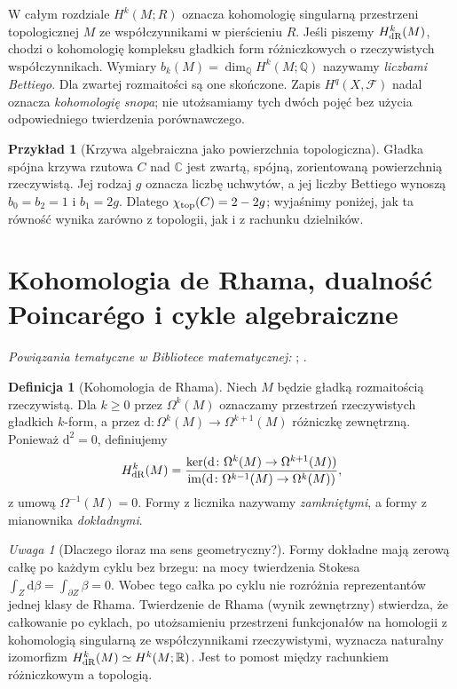 \documentclass[11pt,a4paper,openany]{report}
\numberwithin{equation}{section}
\theoremstyle{plain}
\theoremstyle{definition}
\newtheorem{definicja}[twierdzenie]{Definicja}
\newtheorem{przyklad}[twierdzenie]{Przykład}
\theoremstyle{remark}
\newtheorem{uwaga}[twierdzenie]{Uwaga}
\newcommand{\Q}{\mathbb Q}
\newcommand{\R}{\mathbb R}
\newcommand{\C}{\mathbb C}
\begin{document}
W całym rozdziale $H^k(M;R)$ oznacza kohomologię singularną
przestrzeni topologicznej $M$ ze współczynnikami w pierścieniu $R$.
Jeśli piszemy $H^k_{\rm dR}(M)$, chodzi o kohomologię kompleksu
gładkich form różniczkowych o rzeczywistych współczynnikach.
Wymiary $b_k(M)=\dim_{\Q}H^k(M;\Q)$ nazywamy \emph{liczbami Bettiego}.
Dla zwartej rozmaitości są one skończone. Zapis $H^q(X,\mathcal F)$
nadal oznacza \emph{kohomologię snopa}; nie utożsamiamy tych dwóch
pojęć bez użycia odpowiedniego twierdzenia porównawczego.

\begin{przyklad}[Krzywa algebraiczna jako powierzchnia topologiczna]
Gładka spójna krzywa rzutowa $C$ nad $\C$ jest zwartą, spójną,
zorientowaną powierzchnią rzeczywistą. Jej rodzaj $g$ oznacza liczbę
uchwytów, a jej liczby Bettiego wynoszą $b_0=b_2=1$ i $b_1=2g$.
Dlatego $\chi_{\rm top}(C)=2-2g$; wyjaśnimy poniżej, jak ta
równość wynika zarówno z topologii, jak i z rachunku dzielników.
\end{przyklad}

\section{Kohomologia de Rhama, dualność Poincarégo i cykle algebraiczne}
\label{sec:ga10-de-rham}

\noindent\emph{Powiązania tematyczne w Bibliotece matematycznej:} ; .


\begin{definicja}[Kohomologia de Rhama]
Niech $M$ będzie gładką rozmaitością rzeczywistą.
Dla $k\ge0$ przez $\Omega^k(M)$ oznaczamy przestrzeń
rzeczywistych gładkich $k$-form, a przez $\mathrm d\colon\Omega^k(M)
\to\Omega^{k+1}(M)$ różniczkę zewnętrzną. Ponieważ $\mathrm d^2=0$,
definiujemy
\[
 H^k_{\rm dR}(M)=\frac{\ker(\mathrm d\colon\Omega^k(M)\to
 \Omega^{k+1}(M))}{\operatorname{im}(\mathrm d\colon
 \Omega^{k-1}(M)\to\Omega^k(M))},
\]
z umową $\Omega^{-1}(M)=0$. Formy z licznika nazywamy
\emph{zamkniętymi}, a formy z mianownika \emph{dokładnymi}.
\end{definicja}

\begin{uwaga}[Dlaczego iloraz ma sens geometryczny?]
Formy dokładne mają zerową całkę po każdym cyklu bez brzegu:
na mocy twierdzenia Stokesa $\int_Z\mathrm d\beta
=\int_{\partial Z}\beta=0$. Wobec tego całka po cyklu
nie rozróżnia reprezentantów jednej klasy de Rhama.
Twierdzenie de Rhama (wynik zewnętrzny) stwierdza,
że całkowanie po cyklach, po utożsamieniu przestrzeni
funkcjonałów na homologii z kohomologią singularną
ze współczynnikami rzeczywistymi, wyznacza naturalny
izomorfizm $H^k_{\rm dR}(M)\simeq H^k(M;\R)$.
Jest to pomost między rachunkiem różniczkowym a topologią.
\end{uwaga}
\end{document}
